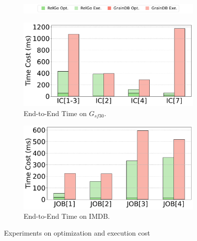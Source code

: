 \begin{figure}[ht]
    \centering
    \begin{subfigure}[b]{\linewidth}
        \centering
        \includegraphics[width=\linewidth]{./figures/exp/opt_exe_legends.pdf}
        \label{fig:exp-opt-legends}
        \vspace*{-2.5ex}
    \end{subfigure}
    \begin{subfigure}[b]{0.48\linewidth}
        \centering
        \includegraphics[width=\linewidth]{./figures/exp/opt_exe_ldbc.pdf}
        \vspace{-1.5em}
        \caption{End-to-End Time on $G_{sf30}$.}
        \label{fig:exp-opt-ldbc}
    \end{subfigure}
    \begin{subfigure}[b]{0.48\linewidth}
        \centering
        \includegraphics[width=\linewidth]{./figures/exp/opt_exe_job.pdf}
        \vspace{-1.5em}
        \caption{End-to-End Time on IMDB.}
        \label{fig:exp-opt-job}
    \end{subfigure}
    \caption{Experiments on optimization and execution cost}
    \label{fig:exp-optimization}
\end{figure}

